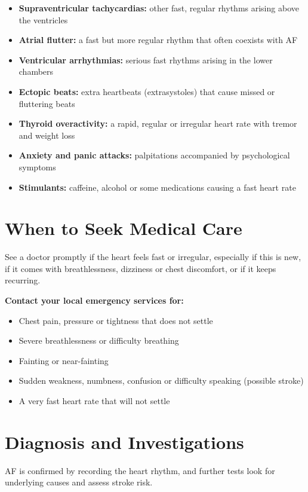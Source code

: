\begin{itemize}
    \item \textbf{Supraventricular tachycardias:} other fast, regular rhythms arising above the ventricles
    \item \textbf{Atrial flutter:} a fast but more regular rhythm that often coexists with AF
    \item \textbf{Ventricular arrhythmias:} serious fast rhythms arising in the lower chambers
    \item \textbf{Ectopic beats:} extra heartbeats (extrasystoles) that cause missed or fluttering beats
    \item \textbf{Thyroid overactivity:} a rapid, regular or irregular heart rate with tremor and weight loss
    \item \textbf{Anxiety and panic attacks:} palpitations accompanied by psychological symptoms
    \item \textbf{Stimulants:} caffeine, alcohol or some medications causing a fast heart rate
\end{itemize}

\section*{When to Seek Medical Care}
See a doctor promptly if the heart feels fast or irregular, especially if this is new, if it comes with breathlessness, dizziness or chest discomfort, or if it keeps recurring.

\textbf{Contact your local emergency services for:}
\begin{itemize}
    \item Chest pain, pressure or tightness that does not settle
    \item Severe breathlessness or difficulty breathing
    \item Fainting or near-fainting
    \item Sudden weakness, numbness, confusion or difficulty speaking (possible stroke)
    \item A very fast heart rate that will not settle
\end{itemize}

\section*{Diagnosis and Investigations}
AF is confirmed by recording the heart rhythm, and further tests look for underlying causes and assess stroke risk.

